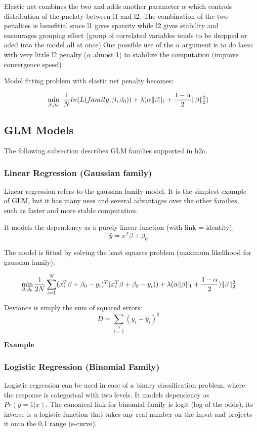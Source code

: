 \documentclass[11pt]{article}
\begin{document}
Elastic net combines the two and adds another parameter $\alpha$ which controls distribution of the pnelaty between l1 and l2. The combination of the two penalties is benefitial since l1 gives sparsity while l2 gives stability and encourages grouping effect (group of correlated variables tends to be dropped or aded into the model all at once).One possible use of the $\alpha$ argument is to do lasso with very little l2 penalty ($\alpha$ almost 1) to stabilize the computation (improve convergence speed)

Model fitting problem with elastic net penalty becomes:

\[ \min\limits_{\beta,\beta_0}\ {{1\over{N}} ln(L(family,\beta,\beta_0))  + \lambda (\alpha \| \beta \|_1}  + {1- \alpha \over 2} \| \beta \|_2^2) \]


\subsection{GLM Models} 
The following subsection describes GLM families supported in h2o. 

\subsubsection{Linear Regression (Gaussian family) }
Linear regression refers to the gaussian family model. It is the simplest example of GLM, but it has many uses and several advantages over the other families, such as faster and more stable computation. 

It models the dependency as a purely linear function (with link = identity):
\[ \hat{y} = x^T\beta + \beta_0\]

The model is fitted by solving the least squares problem (maximum likelihood for gaussian family):

\[ \min\limits_{\beta,\beta_0} { {1 \over 2N}\sum\limits_{i=1}\limits^{N}(x_i^{T}\beta  + \beta_0- y_i)^T (x_i^{T}\beta + \beta_0 - y_i))  + \lambda (\alpha \|\beta \|_1 + {1-\alpha \over 2}) \| \beta \|_2^2} \]


Deviance is simply the sum of squared errors:
\[ D = \sum\limits_{i=1}\limits^{N}{(y_i - \hat{y}_i)^2} \]


\textbf{Example}



\subsubsection{Logistic Regression (Binomial Family)}
Logistic regression can be used in case of a binary classification problem, where the response is categorical with two levels. It models dependency as $Pr(y = 1|x)$. The canonical link for binomial family is logit (log of the odds), its inverse is a logistic function that takes any real number on the input and projects it onto the 0,1 range (s-curve). 
\end{document}
